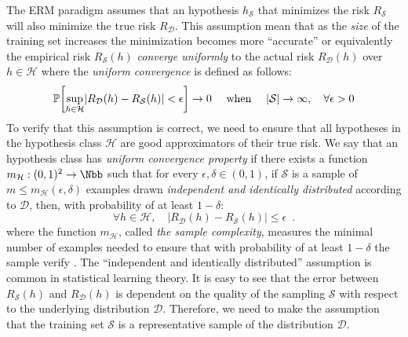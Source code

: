 The ERM paradigm assumes that an hypothesis $h_\mathcal{S}$ that minimizes the risk $R_\mathcal{S}$ will also minimize the true risk $R_\mathcal{D}$.
This assumption mean that as the \emph{size} of the training set increases the minimization becomes more ``accurate'' or equivalently the empirical risk $R_\mathcal{S}(h)$ \emph{converge uniformly} to the actual risk $R_\mathcal{D}(h)$ over $h \in \mathcal{H}$ where the \emph{uniform convergence} is defined as follows:
\begin{equation}
	\Pbb \left[ \sup_{h \in \mathcal{H}} \left| R_\mathcal{D}(h) - R_\mathcal{S}(h) \right| < \epsilon \right] \rightarrow 0 \quad \text{ when } \quad |\mathcal{S}| \rightarrow \infty, \quad \forall \epsilon > 0
\end{equation}
To verify that this assumption is correct, we need to ensure that all hypotheses in the hypothesis class $\mathcal{H}$ are good approximators of their true risk.
We say that an hypothesis class has \emph{uniform convergence property} if there exists a function $m_\mathcal{H}:(0, 1)^2 \rightarrow \Nbb$ such that for every $\epsilon, \delta \in (0, 1)$, if $\mathcal{S}$ is a sample of $m \leq m_\mathcal{H}(\epsilon, \delta)$ examples drawn \emph{independent and identically distributed} according to $\mathcal{D}$, then, with probability of at least $1 - \delta$:
\begin{equation}
	\forall h \in \mathcal{H}, \quad |R_\mathcal{D}(h) - R_\mathcal{S}(h)| \leq \epsilon \enspace.	
	\label{equation:ch2-eps_representative}
\end{equation}
where the function $m_\mathcal{H}$, called \emph{the sample complexity}, measures the minimal number of examples needed to ensure that with probability of at least $1 - \delta$ the sample verify . 
The ``independent and identically distributed'' assumption is common in statistical learning theory.
It is easy to see that the error between $R_\mathcal{S}(h)$ and $R_\mathcal{D}(h)$ is dependent on the quality of the sampling $\mathcal{S}$ with respect to the underlying distribution $\mathcal{D}$.
Therefore, we need to make the assumption that the training set $\mathcal{S}$ is a representative sample of the distribution $\mathcal{D}$.

